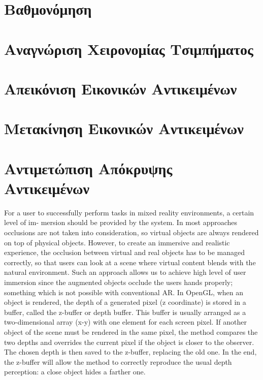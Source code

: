 \section{Βαθμονόμηση}




\section{Αναγνώριση Χειρονομίας Τσιμπήματος}

\section{Απεικόνιση Εικονικών Αντικειμένων} \label{s:rendering}

\section{Μετακίνηση Εικονικών Αντικειμένων} \label{s:manipulation}


\section{Αντιμετώπιση Απόκρυψης Αντικειμένων} \label{s:occlusion}
For a user to successfully perform tasks in mixed reality environments, a certain level of im- mersion should be provided by the system. In most approaches occlusions are not taken into consideration, so virtual objects are always rendered on top of physical objects. However, to create an immersive and realistic experience, the occlusion between virtual and real objects has to be managed correctly, so that users can look at a scene where virtual content blends with the natural environment. Such an approach allows us to achieve high level of user immersion since the augmented objects occlude the users hands properly; something which is not possible with conventional AR. In OpenGL, when an object is rendered, the depth of a generated pixel (z coordinate) is stored in a buffer, called the z-buffer or depth buffer. This buffer is usually arranged as a two-dimensional array (x-y) with one element for each screen pixel. If another object of the scene must be rendered in the same pixel, the method compares the two depths and overrides the current pixel if the object is closer to the observer. The chosen depth is then saved to the z-buffer, replacing the old one. In the end, the z-buffer will allow the method to correctly reproduce the usual depth perception: a close object hides a farther one.

